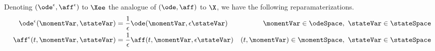 \begin{proposition}
  \label{proposition:ode-reparameterization}
  Denoting $(\ode^\epsilon,\aff^\epsilon)$ to $\Xee$ the analogue of $(\ode,\aff)$ to $\X$, we have the following reparamaterizations.
  \begin{align}
    \ode^\epsilon(\momentVar,\stateVar) &= \frac1\epsilon\ode(\momentVar, \epsilon\stateVar) & \momentVar \in \odeSpace, ~ \stateVar \in \stateSpace\\
    \aff^\epsilon(t, \momentVar, \stateVar) &= \frac1\epsilon\aff(t, \momentVar, \epsilon\stateVar) & (t,\momentVar) \in \momentSpace, ~ \stateVar \in \stateSpace 
  \end{align}
\end{proposition}
